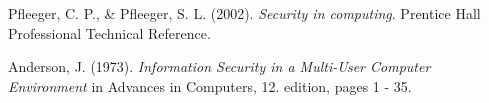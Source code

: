 
\begin{thebibliography}{9}

  Pfleeger, C. P., \& Pfleeger, S. L.
  (2002).
  \textit{Security in computing}.
  Prentice Hall Professional Technical Reference.

  Anderson,  J.
  (1973).
  \emph{Information  Security  in  a  Multi-User  Computer
    Environment} in Advances in Computers,
  12. edition, pages 1 - 35.

\end{thebibliography}
